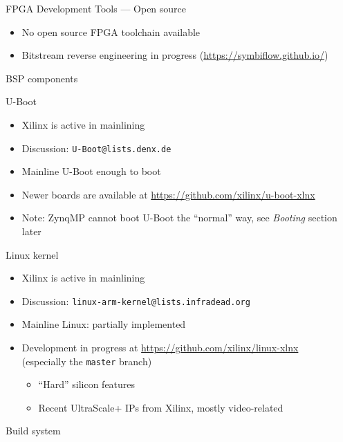 \documentclass[xetex,table]{beamer}
\begin{document}
\begin{frame}{FPGA Development Tools --- Open source}
  \begin{itemize}
  \item No open source FPGA toolchain available
  \item Bitstream reverse engineering in progress
    (\url{https://symbiflow.github.io/})
  \end{itemize}
\end{frame}

\begin{frame}[standout]
  BSP components
\end{frame}

\begin{frame}{U-Boot}
  \begin{itemize}
  \item Xilinx is active in mainlining
  \item Discussion: \texttt{U-Boot@lists.denx.de}
  \item Mainline U-Boot enough to boot
  \item Newer boards are available at
    \url{https://github.com/xilinx/u-boot-xlnx}
  \item Note: ZynqMP cannot boot U-Boot the ``normal'' way, see {\em
    Booting} section later
  \end{itemize}
\end{frame}

\begin{frame}{Linux kernel}
  \begin{itemize}
  \item Xilinx is active in mainlining
  \item Discussion: \texttt{linux-arm-kernel@lists.infradead.org}
  \item Mainline Linux: partially implemented
  \item Development in progress at
    \url{https://github.com/xilinx/linux-xlnx}\\
    (especially the \texttt{master} branch)
    \begin{itemize}
      \item ``Hard'' silicon features
      \item Recent UltraScale+ IPs from Xilinx, mostly video-related
    \end{itemize}
  \end{itemize}
\end{frame}

\begin{frame}[standout]
  Build system
\end{frame}
\end{document}
